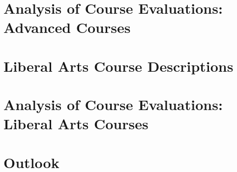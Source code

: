 \documentclass[../../main.tex]{subfiles}
\begin{document}
\section{Analysis of Course Evaluations: Advanced Courses}

\begin{flushleft}

\end{flushleft}

\section{Liberal Arts Course Descriptions}

\begin{flushleft}

\end{flushleft}

\section{Analysis of Course Evaluations: Liberal Arts Courses}

\begin{flushleft}

\end{flushleft}

\section{Outlook}

\begin{flushleft}

\end{flushleft}
\end{document}

